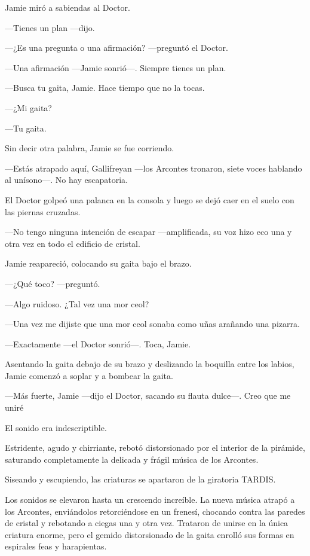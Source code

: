 Jamie miró a sabiendas al Doctor. 

---Tienes un plan ---dijo.

---¿Es una pregunta o una afirmación? ---preguntó el Doctor.

---Una afirmación ---Jamie sonrió---. Siempre tienes un plan.

---Busca tu gaita, Jamie. Hace tiempo que no la tocas.

---¿Mi gaita?

---Tu gaita.

Sin decir otra palabra, Jamie se fue corriendo.

---Estás atrapado aquí, Gallifreyan ---los Arcontes tronaron, siete
voces hablando al unísono---. No hay escapatoria.

El Doctor golpeó una palanca en la consola y luego se dejó caer en el
suelo con las piernas cruzadas. 

---No tengo ninguna intención de escapar ---amplificada, su voz hizo eco
una y otra vez en todo el edificio de cristal.

Jamie reapareció, colocando su gaita bajo el brazo. 

---¿Qué toco? ---preguntó.

---Algo ruidoso. ¿Tal vez una mor ceol?

---Una vez me dijiste que una mor ceol sonaba como uñas arañando una
pizarra.

---Exactamente ---el Doctor sonrió---. Toca, Jamie.

Asentando la gaita debajo de su brazo y deslizando la boquilla entre los
labios, Jamie comenzó a soplar y a bombear la gaita.

---Más fuerte, Jamie ---dijo el Doctor, sacando su flauta dulce---. Creo
que me uniré

El sonido era indescriptible.

Estridente, agudo y chirriante, rebotó distorsionado por el interior de
la pirámide, saturando completamente la delicada y frágil música de los
Arcontes.

Siseando y escupiendo, las criaturas se apartaron de la giratoria
TARDIS.

Los sonidos se elevaron hasta un crescendo increíble. La nueva música
atrapó a los Arcontes, enviándolos retorciéndose en un frenesí, chocando
contra las paredes de cristal y rebotando a ciegas una y otra vez.
Trataron de unirse en la única criatura enorme, pero el gemido
distorsionado de la gaita enrolló sus formas en espirales feas y
harapientas.


